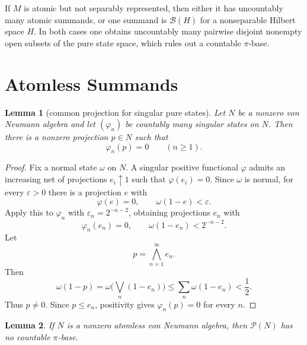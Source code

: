 \documentclass[11pt]{article}
\newtheorem{lemma}{Lemma}
\newcommand{\Bcal}{\mathcal B}
\newcommand{\Pcal}{\mathcal P}
\begin{document}
If \(M\) is atomic but not separably represented, then either it has
uncountably many atomic summands, or one summand is \(\Bcal(H)\) for a
nonseparable Hilbert space \(H\).  In both cases one obtains uncountably many
pairwise disjoint nonempty open subsets of the pure state space, which rules
out a countable \(\pi\)-base.

\section*{Atomless Summands}

\begin{lemma}[common projection for singular pure states]
\label{lem:common}
Let \(N\) be a nonzero von Neumann algebra and let
\((\varphi_n)\) be countably many singular states on \(N\).  Then there is a
nonzero projection \(p\in N\) such that
\[
        \varphi_n(p)=0\qquad(n\ge1).
\]
\end{lemma}

\begin{proof}
Fix a normal state \(\omega\) on \(N\).  A singular positive functional
\(\varphi\) admits an increasing net of projections \(e_i\uparrow1\) such
that \(\varphi(e_i)=0\).  Since \(\omega\) is normal, for every
\(\varepsilon>0\) there is a projection \(e\) with
\[
        \varphi(e)=0,\qquad \omega(1-e)<\varepsilon.
\]
Apply this to \(\varphi_n\) with \(\varepsilon_n=2^{-n-2}\), obtaining
projections \(e_n\) with
\[
        \varphi_n(e_n)=0,\qquad \omega(1-e_n)<2^{-n-2}.
\]
Let
\[
        p=\bigwedge_{n=1}^{\infty} e_n.
\]
Then
\[
        \omega(1-p)
        =
        \omega\Big(\bigvee_n(1-e_n)\Big)
        \le
        \sum_n\omega(1-e_n)
        <
        \frac12.
\]
Thus \(p\ne0\).  Since \(p\le e_n\), positivity gives
\(\varphi_n(p)=0\) for every \(n\).
\end{proof}

\begin{lemma}
\label{lem:atomless}
If \(N\) is a nonzero atomless von Neumann algebra, then \(\Pcal(N)\) has no
countable \(\pi\)-base.
\end{lemma}
\end{document}
